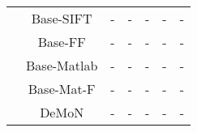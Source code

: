 \documentclass[10pt,twocolumn,letterpaper]{article}
\begin{document}
\begin{table}
\begin{minipage}{0.73\linewidth}
\begin{flushleft}
{\begin{tabular}{|c|c|ccc|cc|}
                                                                           & Base-SIFT   &     -        &     -      &     -      &     -      &    -              \\
                                                                           & Base-FF     &     -        &     -      &     -      &     -      &    -              \\
                                                                           & Base-Matlab &     -        &     -      &     -      &     -      &    -             
                                                                           \\
                                                                           & Base-Mat-F  &     -        &     -      &     -      &     -      &    -
                                                                           \\
                                                                           & DeMoN       &     -        &     -      &     -      &     -      &    -              \\
      \hline


\end{tabular}}
\end{flushleft}
\end{minipage}
\end{table}
\end{document}
